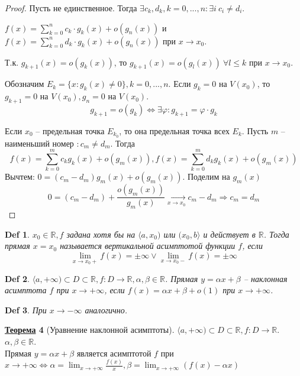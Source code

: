 \documentclass[12pt]{article}
\def\R{\mathbb{R}}       %
\def\PHI{\varphi}        %
\def\SO{\Rightarrow}     %
\def\EQ{\Leftrightarrow} %
\theoremstyle{definition} %
\newtheorem{Thm}{\underline{Теорема}}[subsection] %
\theoremstyle{plain} %
\newtheorem{Def}[Thm]{Def} %
\theoremstyle{remark} %
\begin{document}
\begin{proof}
    Пусть не единственное. Тогда $\exists c_k, d_k, k = 0, ..., n : \exists i \ c_i \neq d_i$.
    
    $f(x) = \sum_{k=0}^{n} c_k \cdot g_k(x) + o(g_n(x))$ и $f(x) = \sum_{k=0}^{n} d_k \cdot g_k(x) + o(g_n(x))$ при $x \to x_0$.
    
    Т.к. $g_{k + 1}(x) = o(g_k(x))$, то $g_{k + 1}(x) = o(g_l(x)) \ \forall l \leqslant k$ при $x \to x_0$.

    Обозначим $E_k = \{x : g_k(x) \neq 0\}, k = 0, ..., n$. Если $g_k = 0$ на $V(x_0)$, то $g_{k + 1} = 0$ на $V(x_0), g_n = 0$ на $V(x_0)$. 
    \[g_{k + 1} = o(g_k) \EQ \exists \PHI : g_{k + 1} = \PHI \cdot g_k\]

    Если $x_0$ -- предельная точка $E_{k_0}$, то она предельная точка всех $E_k$.
    Пусть $m$ -- наименьший номер $: c_m \neq d_m$. Тогда 
    \[f(x) = \sum_{k=0}^{m} c_k g_k(x) + o(g_m(x)), f(x) = \sum_{k=0}^{m} d_k g_k(x) + o(g_m(x))\]
    Вычтем: $0 = (c_m - d_m) g_m(x) + o(g_m(x))$. Поделим на $g_m(x)$ 
    \[0 = (c_m - d_m) + \frac{o(g_m(x))}{g_m(x)} \xrightarrow[x \to x_0]{} c_m - d_m \SO c_m = d_m\]
\end{proof}

\begin{Def}
    $x_0 \in \R, f$ задана хотя бы на $\langle a, x_0)$ или $(x_0, b\rangle$ и действует в $\R$. 
    Тогда прямая $x = x_0$ называется вертикальной асимптотой функции $f$, если 
    \[\lim_{x \to x_0+}f(x) = \pm \infty \vee \lim_{x \to x_0-} f(x) = \pm \infty\] 
\end{Def}

\begin{Def}
    $\langle a, +\infty) \subset D \subset \R, f : D \to \R, \alpha, \beta \in \R$. 
    Прямая $y = \alpha x + \beta$ -- наклонная асимптота $f$ при $x \to +\infty$, если $f(x) = \alpha x + \beta + o(1)$ при $x \to +\infty$.
\end{Def}

\begin{Def}
    При $x \to -\infty$ аналогично.
\end{Def}

\begin{Thm}[Уравнение наклонной асимптоты]
    $\langle a, +\infty) \subset D \subset \R, f : D \to \R$. $\alpha, \beta \in \R$. \\
    Прямая $y = \alpha x + \beta$ является асимптотой $f$ при $x \to +\infty \EQ \alpha = \lim_{x \to +\infty} \frac{f(x)}{x}, \beta = \lim_{x \to +\infty} (f(x) - \alpha x)$    
\end{Thm}
\end{document}
